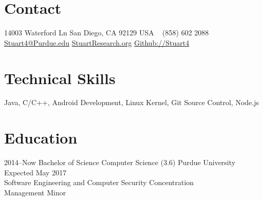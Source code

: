 \documentclass[]{friggeri-cv} %
\begin{document}


\begin{aside} %
\section{Contact}
14003 Waterford Ln
San Diego, CA 92129
USA
~
(858) 602 2088
~
\href{mailto:stuart4@purdue.edu}{Stuart4@Purdue.edu}
\href{http://stuartresearch.org}{StuartResearch.org}
\href{https://www.github.com/Stuart4}{Github://Stuart4}
~
\section{Technical Skills}
Java, C/C++,
Android Development,
Linux Kernel,
Git Source Control,
Node.js
\end{aside}


\section{Education}

\begin{entrylist}


\entry
{2014--Now}
{Bachelor of Science {\normalfont Computer Science} (3.6)}
{Purdue University}
{Expected May 2017\\
Software Engineering and Computer Security Concentration\\
Management Minor}


\end{entrylist}

\end{document}
